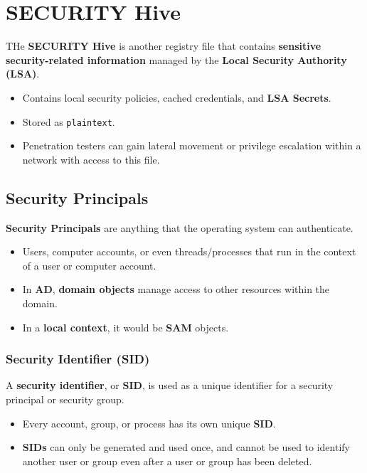 \documentclass[12pt, letterpaper]{article}
\begin{document}
\section*{SECURITY Hive}

THe \textbf{SECURITY Hive} is another registry file that contains \textbf{sensitive security-related information} managed by the \textbf{Local Security Authority (LSA)}.

\begin{itemize}
    \item Contains local security policies, cached credentials, and \textbf{LSA Secrets}.
    \item Stored as \texttt{plaintext}.
    \item Penetration testers can gain lateral movement or privilege escalation within a network with access to this file.
\end{itemize}

\subsection*{Security Principals}

\textbf{Security Principals} are anything that the operating system can authenticate.

\begin{itemize}
    \item Users, computer accounts, or even threads/processes that run in the context of a user or computer account.
    \item In \textbf{AD}, \textbf{domain objects} manage access to other resources within the domain.
    \item In a \textbf{local context}, it would be \textbf{SAM} objects. %
\end{itemize}


\subsubsection*{Security Identifier (SID)}

A \textbf{security identifier}, or \textbf{SID}, is used as a unique identifier for a security principal or security group.

\begin{itemize}
    \item Every account, group, or process has its own unique \textbf{SID}.
    \item \textbf{SIDs} can only be generated and used once, and cannot be used to identify another user or group even after a user or group has been deleted.
\end{itemize}
\end{document}
